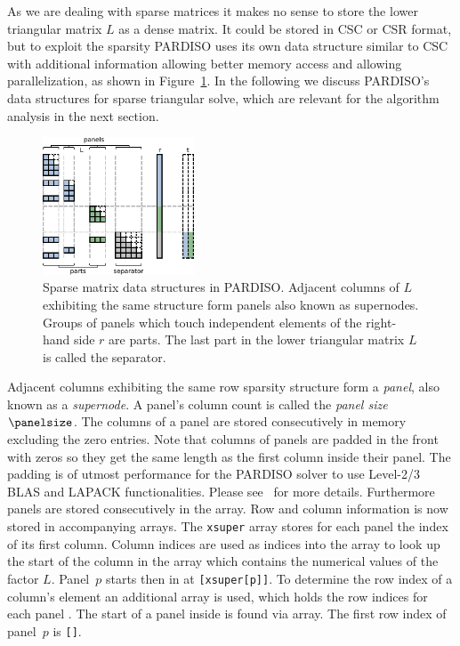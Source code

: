 As we are dealing with sparse matrices it makes no sense to store the lower
triangular matrix $L$ as a dense matrix.
It could be stored in CSC or CSR format, but to exploit the sparsity PARDISO uses its own data structure similar to CSC with additional information allowing better memory access and allowing parallelization, as shown in
Figure~\ref{fig:algo:ds}. 
In the following we discuss PARDISO's data structures for sparse triangular
solve, which are relevant for the algorithm analysis in the next section.

\begin{figure}[t]
  \centering
    \includegraphics[width=0.4\textwidth,clip=true]{images/parts-panels-separator}
  \caption{Sparse matrix data structures in PARDISO. Adjacent columns of $L$ exhibiting the same
structure form panels also known as supernodes. 
Groups of panels which touch independent elements of the right-hand side $r$ are
parts. The last part in the lower triangular matrix $L$ is called the separator.}
  \label{fig:algo:ds}
\end{figure}

Adjacent columns exhibiting the same row sparsity structure form a
\textit{panel}, also known as a \textit{supernode}.
A panel's column count is called the \textit{panel size} $\panelsize$.
The columns of a panel are stored consecutively in memory excluding the zero
entries. 
Note that columns of panels are padded in the front with zeros so they get the 
same length as the first column inside their panel. 
The padding is of utmost performance for the PARDISO solver to use Level-2/3
BLAS and LAPACK functionalities. Please see~\cite{20.500.11850/144477} for more
details. 
Furthermore panels are stored consecutively in the \vlnz{} array. 
Row and column information is now stored in accompanying arrays.
The \texttt{xsuper} array stores for each panel the index of its first column. 
Column indices are used as indices into the \vxlnz{} array to look up the
start of
the column in the \vlnz{} array which contains the numerical values of the factor $L$.
Panel~$p$ starts then in \vlnz{} at \vxlnz\texttt{[xsuper[p]]}.
To determine the row index of a column's element an additional array \vindx{} is
used, which holds the row indices for each panel .
The start of a panel inside \vindx{} is found via \vxindx{} array.
The first row index of panel~$p$ is \vindx\texttt{[\vxindx[p]]}.

